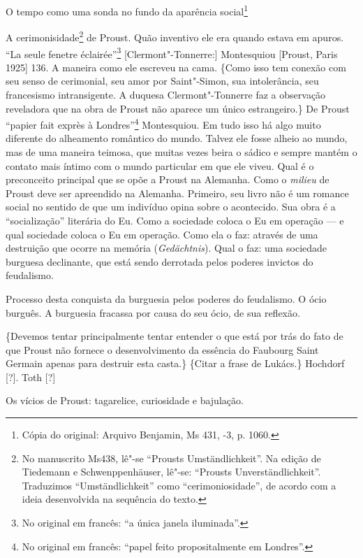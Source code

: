 O tempo como uma sonda no fundo da aparência social\footnote{Cópia do original: Arquivo Benjamin, Ms 431, -3, p. 1060.}

A cerimonisidade\footnote{No manuscrito Ms438, lê"-se ``Prousts
  Umständlichkeit''. Na edição de Tiedemann e Schwenppenhäuser, lê"-se:
  ``Prousts Unverständlichkeit''. Traduzimos ``Umständlichkeit'' como
  ``cerimoniosidade'', de acordo com a ideia desenvolvida na sequência
  do texto. \versal{[N. T.]}} de Proust. Quão inventivo ele era quando estava em apuros.
``La seule fenetre éclairée''\footnote{No original em francês: ``a
  única janela iluminada''. \versal{[N. T.]}} {[}Clermont"-Tonnerre:{]} Montesquiou
{[}Proust, Paris 1925{]} 136. A maneira como ele escreveu na cama.
\{Como isso tem conexão com seu senso de cerimonial, seu amor por
Saint"-Simon, sua intolerância, seu francesismo intransigente. A duquesa
Clermont"-Tonnerre faz a observação reveladora que na obra de Proust não
aparece um único estrangeiro.\} De Proust ``papier fait exprès à
Londres''\footnote{No original em francês: ``papel feito %
  propositalmente em Londres''. \versal{[N. T.]}} Montesquiou. Em tudo isso há algo muito
diferente do alheamento romântico do mundo. Talvez ele fosse alheio ao
mundo, mas de uma maneira teimosa, que muitas vezes beira o sádico e
sempre mantém o contato mais íntimo com o mundo particular em que ele
viveu. Qual é o preconceito principal que se opõe a Proust na Alemanha.
Como o \emph{milieu} de Proust deve ser apreendido na Alemanha.
Primeiro, seu livro não é um romance social no sentido de que um
indivíduo opina sobre o acontecido. Sua obra é a ``socialização''
literária do Eu. Como a sociedade coloca o Eu em operação --- e qual
sociedade coloca o Eu em operação. Como ela o faz: através de uma
destruição que ocorre na memória (\emph{Gedächtnis}). Qual o faz: uma
sociedade burguesa declinante, que está sendo derrotada pelos poderes
invictos do feudalismo.

Processo desta conquista da burguesia pelos poderes do feudalismo. O
ócio burguês. A burguesia fracassa por causa do seu ócio, de sua
reflexão.

\{Devemos tentar principalmente tentar entender o que está por trás do
fato de que Proust não fornece o desenvolvimento da essência do Faubourg
Saint Germain apenas para destruir esta casta.\} \{Citar a frase de
Lukács.\} Hochdorf {[}?{]}. Toth {[}?{]}

Os vícios de Proust: tagarelice, curiosidade e bajulação.

